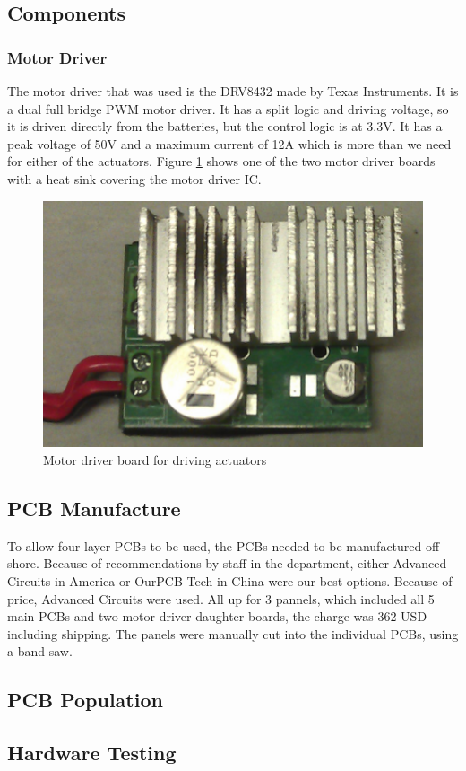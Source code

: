   \subsection{Components}

    \subsubsection{Motor Driver}
    The motor driver that was used is the DRV8432 made by Texas
    Instruments\cite{ti-motor-driver}. It is a dual full bridge PWM motor
    driver.  It has a split logic and driving voltage, so it is driven directly
    from the batteries, but the control logic is at 3.3V. It has a peak voltage
    of 50V and a maximum current of 12A which is more than we need for either
    of the actuators. Figure \ref{motorPCB} shows one of the two motor driver
    boards with a heat sink covering the motor driver IC.

     \begin{figure}[h]
         \centering
         \includegraphics[width=.9\linewidth]{Images/motorPCB.png}
         \caption{Motor driver board for driving actuators}
         \label{motorPCB}
     \end{figure}

  
  \subsection{PCB Manufacture}
  To allow four layer PCBs to be used, the PCBs needed to be manufactured
  off-shore. Because of recommendations by staff in the department, either
  Advanced Circuits in America\cite{advancedCircuits} or OurPCB Tech in
  China\cite{ourPCB} were our best options.  Because of price, Advanced Circuits
  were used. All up for 3 pannels, which included all 5 main PCBs and two motor
  driver daughter boards, the charge was 362 USD including shipping. The panels
  were manually cut into the individual PCBs, using a band saw.
  
  \subsection{PCB Population}
  
  \subsection{Hardware Testing}
